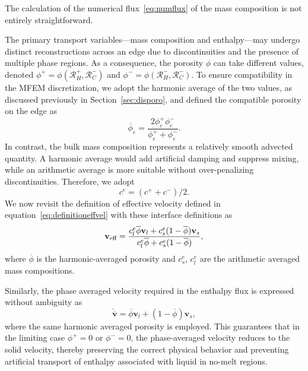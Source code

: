 The calculation of the numerical flux~\eqref{eq:numflux} of the mass composition is not 
entirely straightforward.

The primary transport variables—mass composition and enthalpy—may undergo distinct reconstructions across an edge due 
to discontinuities and the presence of multiple phase regions. As a consequence,
the porosity $\phi$ can take different values, denoted $\phi^+ = \phi(\mathcal{R}^+_H, \mathcal{R}^-_C)$ and $\phi^- = \phi(\mathcal{R}^-_H,
\mathcal{R}^-_C)$.
To ensure compatibility in the MFEM discretization, we adopt the harmonic average of the two values, as discussed
previously in Section~\ref{sec:disporo}, and defined the compatible porosity on the edge as
\begin{equation*}
		  \overline{\phi}_e = \frac{2\phi_e^{+}\phi_e^{-}}{\phi_e^{+} + \phi_e^{-}}.
\end{equation*}
In contrast, the bulk mass composition represents a relatively smooth advected quantity. 
A harmonic average would add artificial damping and suppress mixing, while an arithmetic average
is more suitable without over-penalizing discontinuities. Therefore, we adopt
\begin{equation}
c^e = (c^+ + c^-)/2.
\end{equation}
We now revisit the definition of effective velocity defined in equation~\eqref{eq:definitioneffvel} 
with these interface definitions as
\begin{equation}
\bold{v}_{\text{eff}} = \frac{c^e_l \overline{\phi} \bold{v}_l + 
c^e_s(1-\overline{\phi}) \bold{v}_s}{c^e_l\overline{\phi} + c^e_s (1-\overline{\phi})},
\end{equation}
where $\overline{\phi}$ is the harmonic-averaged porosity and $c^e_s$, $c^e_l$ are the arithmetic averaged
mass compositions. 

Similarly, the phase averaged velocity required in the enthalpy flux is expressed without ambiguity as
\begin{equation}
\check{\overline{\mathbf{v}}} = \overline{\phi}\mathbf{v}_l  + (1-\overline{\phi})\mathbf{v}_s,
\end{equation}
where the same harmonic averaged porosity is employed.
This guarantees that in the limiting case $\phi^+ = 0$ or $\phi^- = 0$, the phase-averaged velocity reduces
to the solid velocity, thereby preserving the correct physical behavior and preventing artificial
transport of enthalpy associated with liquid in no-melt regions.

